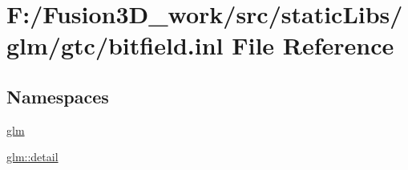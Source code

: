 \hypertarget{bitfield_8inl}{}\section{F\+:/\+Fusion3\+D\+\_\+work/src/static\+Libs/glm/gtc/bitfield.inl File Reference}
\label{bitfield_8inl}
\subsection*{Namespaces}
\begin{DoxyCompactItemize}
\item 
 \hyperlink{namespaceglm}{glm}
\item 
 \hyperlink{namespaceglm_1_1detail}{glm\+::detail}
\end{DoxyCompactItemize}
